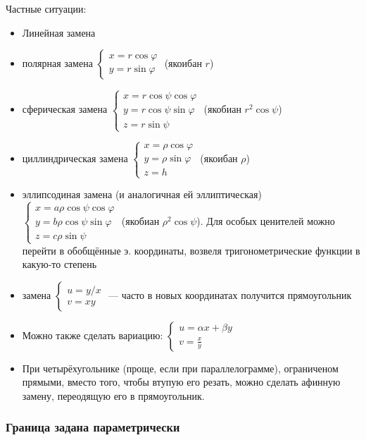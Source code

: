 \documentclass[12pt, a4paper]{article}
\begin{document}
Частные ситуации:
\begin{itemize}
  \item Линейная замена
  \item полярная замена $\begin{cases}
    x = r \cos \varphi \\
    y = r \sin \varphi
  \end{cases}$ (якоибан $r$)
  \item сферическая замена $\begin{cases}
    x = r \cos \psi \cos \varphi \\
    y = r \cos \psi \sin \varphi \\
    z = r \sin \psi
  \end{cases}$ (якобиан $r^2 \cos \psi$)
  \item циллиндрическая замена $\begin{cases}
    x = \rho \cos \varphi \\
    y = \rho \sin \varphi \\
    z = h
  \end{cases}$ (якоибан $\rho$)
  \item эллипсодиная замена (и аналогичная ей эллиптическая) $\begin{cases}
    x = a \rho \cos \psi \cos \varphi \\
    y = b \rho \cos \psi \sin \varphi \\
    z = c \rho \sin \psi
  \end{cases}$ (якобиан $\rho^2 \cos \psi$). 
  Для особых ценителей можно перейти в обобщённые э. координаты, возвеля тригонометрические функции в какую-то степень
  \item замена $\begin{cases}
    u = y/x \\
    v = xy
  \end{cases}$ — часто в новых координатах получится прямоугольник
  \item Можно также сделать вариацию: $\begin{cases}
    u = \alpha x + \beta y \\
    v = \frac{x}{y}
  \end{cases}$
  \item При четырёхугольнике (проще, если при параллелограмме), ограниченом прямыми,
  вместо того, чтобы втупую его резать, можно сделать афинную замену,
  переодящую его в прямоугольник.
\end{itemize}

\subsubsection{Граница задана параметрически}
\end{document}
